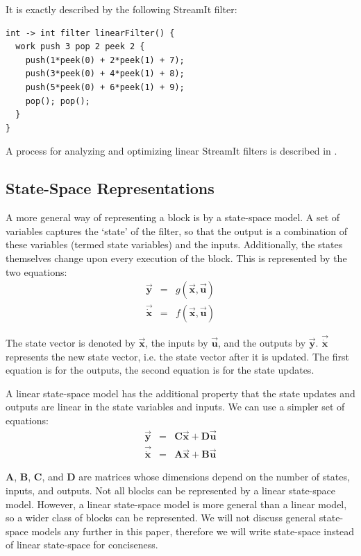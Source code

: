     It is exactly described by the following StreamIt filter:
\begin{scriptsize}
\begin{verbatim}
int -> int filter linearFilter() {
  work push 3 pop 2 peek 2 {
    push(1*peek(0) + 2*peek(1) + 7);
    push(3*peek(0) + 4*peek(1) + 8);
    push(5*peek(0) + 6*peek(1) + 9);
    pop(); pop();
  }
}
\end{verbatim}
\end{scriptsize}

    A process for analyzing and optimizing linear StreamIt filters
is described in \cite{Lamb}.

\subsection{State-Space Representations}

    A more general way of representing a block is by a state-space model.
A set of variables captures the `state' of the filter, so that the
output is a combination of these variables (termed state
variables) and the inputs. Additionally, the states themselves
change upon every execution of the block. This is represented by
the two equations:
\begin{eqnarray*}
\vec{\mathbf{y}} & = & g(\vec{\mathbf{x}},\vec{\mathbf{u}}) \\
\vec{\dot{\mathbf{x}}} & = & f(\vec{\mathbf{x}},\vec{\mathbf{u}})
\end{eqnarray*}

    The state vector is denoted by $\vec{\mathbf{x}}$, the inputs by $\vec{\mathbf{u}}$,
and the outputs by $\vec{\mathbf{y}}$. $\vec{\dot{\mathbf{x}}}$
represents the new state vector, i.e. the state vector after it is
updated. The first equation is for the outputs, the second
equation is for the state updates.

    A linear state-space model has the additional property that
the state updates and outputs are linear in the state variables
and inputs. We can use a simpler set of equations:
\begin{eqnarray*}
\vec{\mathbf{y}} & = & \mathbf{C}\vec{\mathbf{x}}  +
\mathbf{D}\vec{\mathbf{u}} \\
\vec{\dot{\mathbf{x}}} & = & \mathbf{A}\vec{\mathbf{x}} +
\mathbf{B}\vec{\mathbf{u}}
\end{eqnarray*}

    $\mathbf{A}$, $\mathbf{B}$, $\mathbf{C}$, and $\mathbf{D}$ are
matrices whose dimensions depend on the number of states, inputs,
and outputs. Not all blocks can be represented by a linear
state-space model. However, a linear state-space model is more
general than a linear model, so a wider class of blocks can be
represented. We will not discuss general state-space models any
further in this paper, therefore we will write state-space instead
of linear state-space for conciseness.

